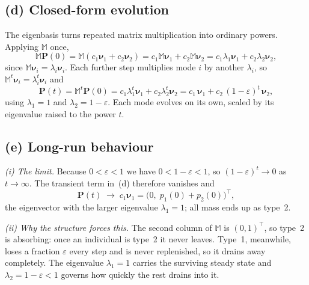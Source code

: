 \documentclass[12pt,a4paper]{article}
\theoremstyle{definition}
\newcommand{\T}{^{\!\top}}
\newcommand{\M}{\mathbb{M}}
\begin{document}
\subsection{(d) Closed-form evolution}
The eigenbasis turns repeated matrix multiplication into ordinary powers. Applying $\M$ once,
\begin{equation}
  \M\bm P(0)=\M(c_1\bm\nu_1+c_2\bm\nu_2)=c_1\M\bm\nu_1+c_2\M\bm\nu_2=c_1\lambda_1\bm\nu_1+c_2\lambda_2\bm\nu_2,
\end{equation}
since $\M\bm\nu_i=\lambda_i\bm\nu_i$. Each further step multiplies mode $i$ by another $\lambda_i$,
so $\M^{t}\bm\nu_i=\lambda_i^{t}\bm\nu_i$ and
\begin{equation}
  \bm P(t)=\M^{t}\bm P(0)=c_1\lambda_1^{t}\bm\nu_1+c_2\lambda_2^{t}\bm\nu_2
  =c_1\,\bm\nu_1+c_2\,(1-\varepsilon)^{t}\,\bm\nu_2 ,
\end{equation}
using $\lambda_1=1$ and $\lambda_2=1-\varepsilon$. Each mode evolves on its own, scaled by its
eigenvalue raised to the power $t$.

\subsection{(e) Long-run behaviour}
\emph{(i) The limit.} Because $0<\varepsilon<1$ we have $0<1-\varepsilon<1$, so
$(1-\varepsilon)^{t}\to0$ as $t\to\infty$. The transient term in~(d) therefore vanishes and
\begin{equation}
  \bm P(t)\;\longrightarrow\;c_1\bm\nu_1=\bigl(0,\;p_1(0)+p_2(0)\bigr)\T ,
\end{equation}
the eigenvector with the larger eigenvalue $\lambda_1=1$; all mass ends up as type~2.

\emph{(ii) Why the structure forces this.} The second column of $\M$ is $(0,1)\T$, so type~2 is
absorbing: once an individual is type~2 it never leaves. Type~1, meanwhile, loses a fraction
$\varepsilon$ every step and is never replenished, so it drains away completely. The eigenvalue
$\lambda_1=1$ carries the surviving steady state and $\lambda_2=1-\varepsilon<1$ governs how
quickly the rest drains into it.
\end{document}
